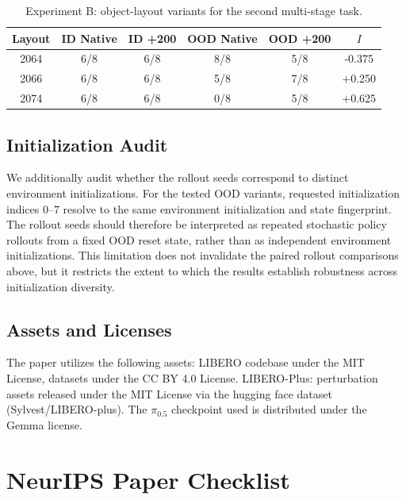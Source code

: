 \documentclass{article}
\begin{document}
\begin{table}[h]
\centering
\small
\caption{Experiment B: object-layout variants for the second multi-stage task.}
\label{tab:exp_b_detail}
\begin{tabular}{c|cc|cc|c}
\hline
Layout & ID Native & ID +200 & OOD Native & OOD +200 & \(I\) \\
\hline
2064 & 6/8 & 6/8 & 8/8 & 5/8 & -0.375 \\
2066 & 6/8 & 6/8 & 5/8 & 7/8 & +0.250 \\
2074 & 6/8 & 6/8 & 0/8 & 5/8 & +0.625 \\
\hline
\end{tabular}
\end{table}

\subsection{Initialization Audit}

We additionally audit whether the rollout seeds correspond to distinct environment initializations. For the tested OOD variants, requested initialization indices 0--7 resolve to the same environment initialization and state fingerprint. The rollout seeds should therefore be interpreted as repeated stochastic policy rollouts from a fixed OOD reset state, rather than as independent environment initializations. This limitation does not invalidate the paired rollout comparisons above, but it restricts the extent to which the results establish robustness across initialization diversity.

\subsection{Assets and Licenses}

The paper utilizes the following assets: LIBERO codebase under the MIT License,  datasets under the CC BY 4.0 License. LIBERO-Plus: perturbation assets released under the MIT License via the hugging face dataset (Sylvest/LIBERO-plus). The $\pi_{0.5}$ checkpoint used is distributed under the Gemma license.

\section*{NeurIPS Paper Checklist}
\end{document}
